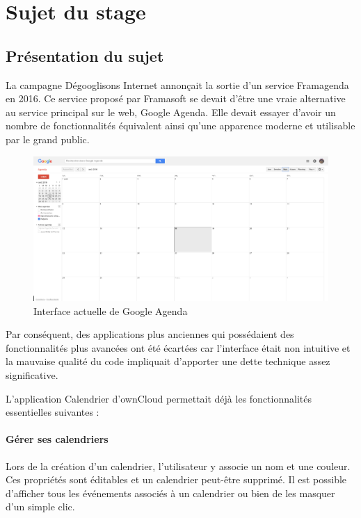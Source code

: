 \documentclass[10pt,a4paper, twoside]{report}
\begin{document}
	\newpage\null\thispagestyle{empty}\newpage
	\chapter{Sujet du stage}
	
	\section{Présentation du sujet}
	
	La campagne Dégooglisons Internet annonçait la sortie d'un service Framagenda en 2016. Ce service proposé par Framasoft se devait d'être une vraie alternative au service principal sur le web, Google Agenda. Elle devait essayer d'avoir un nombre de fonctionnalités équivalent ainsi qu'une apparence moderne et utilisable par le grand public.
	
	\begin{figure}[ht]
		\centering
		\centerline{\includegraphics[width=1.5\textwidth]{images/google-agenda-interface-actuelle.png}}
		\caption{Interface actuelle de Google Agenda}
		\label{google-agenda}
	\end{figure}
	
	Par conséquent, des applications plus anciennes qui possédaient des fonctionnalités plus avancées ont été écartées car l'interface était non intuitive et la mauvaise qualité du code impliquait d'apporter une dette technique assez significative.
	
	L'application Calendrier d'ownCloud permettait déjà les fonctionnalités essentielles suivantes :
	
	\subsubsection{Gérer ses calendriers}
	Lors de la création d'un calendrier, l'utilisateur y associe un nom et une couleur. Ces propriétés sont éditables et un calendrier peut-être supprimé. Il est possible d'afficher tous les événements associés à un calendrier ou bien de les masquer d'un simple clic.
	
\end{document}
